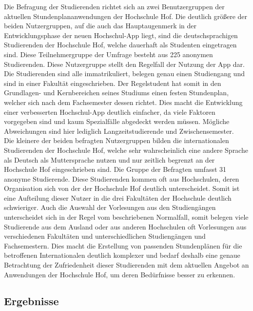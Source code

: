 Die Befragung der Studierenden richtet sich an zwei Benutzergruppen der aktuellen Stundenplananwendungen der Hochschule Hof. 
Die deutlich größere der beiden Nutzergruppen, auf die auch das Hauptaugenmerk in der Entwicklungsphase der neuen Hochschul-\ac{App} liegt, sind die deutschsprachigen Studierenden der Hochschule Hof, welche dauerhaft als Studenten eingetragen sind. Diese Teilnehmergruppe der Umfrage besteht aus 225 anonymen Studierenden. 
Diese Nutzergruppe stellt den Regelfall der Nutzung der \ac{App} dar. Die Studierenden sind alle immatrikuliert, belegen genau einen Studiengang und sind in einer Fakultät eingeschrieben. Der Regelstudent hat somit in den Grundlagen- und Kernbereichen seines Studiums einen festen Stundenplan, welcher sich nach dem Fachsemester dessen richtet. Dies macht die Entwicklung einer verbesserten Hochschul-\ac{App} deutlich einfacher, da viele Faktoren vorgegeben sind und kaum Spezialfälle abgedeckt werden müssen. Mögliche Abweichungen sind hier lediglich Langzeitstudierende und Zwischensemester.
\\
\linebreak
Die kleinere der beiden befragten Nutzergruppen bilden die internationalen Studierenden der Hochschule Hof, welche sehr wahrscheinlich eine andere Sprache als Deutsch als Muttersprache nutzen und nur zeitlich begrenzt an der Hochschule Hof eingeschrieben sind. Die Gruppe der Befragten umfasst 31 anonyme Studierende. 
Diese Studierenden kommen oft aus Hochschulen, deren Organisation sich von der der Hochschule Hof deutlich unterscheidet. Somit ist eine Aufteilung dieser Nutzer in die drei Fakultäten der Hochschule deutlich schwieriger. Auch die Auswahl der Vorlesungen aus den Studiengängen unterscheidet sich in der Regel vom beschriebenen Normalfall, somit belegen viele Studierende aus dem Ausland oder aus anderen Hochschulen oft Vorlesungen aus verschiedenen Fakultäten und unterschiedlichen Studiengängen und Fachsemestern. Dies macht die Erstellung von passenden Stundenplänen für die betroffenen Internationalen deutlich komplexer und bedarf deshalb eine genaue Betrachtung der Zufriedenheit dieser Studierenden mit dem aktuellen Angebot an Anwendungen der Hochschule Hof, um deren Bedürfnisse besser zu erkennen.

\subsection{Ergebnisse\label{sec:umfrage_erg}}

